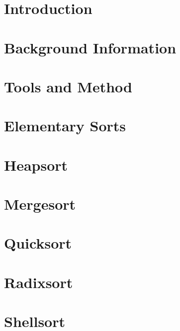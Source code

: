 \documentclass{report}
\begin{document}
\setlength{\parskip}{1em}
\setlength{\parindent}{0ex}

\chapter{Introduction}



\chapter{Background Information}



\chapter{Tools and Method}



\chapter{Elementary Sorts}



\chapter{Heapsort}



\chapter{Mergesort}



\chapter{Quicksort}



\chapter{Radixsort}



\chapter{Shellsort}


\end{document}
